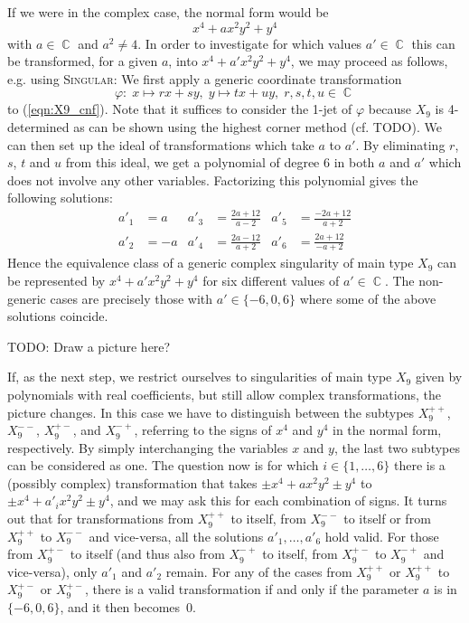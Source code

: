 \documentclass{amsproc}
\newcommand{\Singular}{\textsc{Singular}}
\DeclareMathOperator{\C}{\mathbb{C}}
\begin{document}
If we were in the complex case, the normal form would be
\begin{equation}\label{eqn:X9_cnf}
x^4 +ax^2y^2 +y^4
\end{equation}
with $a \in \C$ and $a^2 \neq 4$. In order to investigate for which values
$a' \in \C$ this can be transformed, for a given $a$, into
$x^4 +a'x^2y^2 +y^4$, we may proceed as follows, e.g. using \Singular:
We first apply a generic coordinate transformation
\[
\varphi: \; x \mapsto rx+sy, \; y \mapsto tx+uy, \; r,s,t,u \in \C
\]
to (\ref{eqn:X9_cnf}). Note that it suffices to consider the 1-jet of $\varphi$
because $X_9$ is 4-determined as can be shown using the highest corner method
(cf. TODO). We can then set up the ideal of transformations which take $a$ to
$a'$. By eliminating $r$, $s$, $t$ and $u$ from this ideal, we get a polynomial
of degree 6 in both $a$ and $a'$ which does not involve any other variables.
Factorizing this polynomial gives the following solutions:
\begin{align*}
a'_1 &= a  & a'_3 &= \frac{2a+12}{a-2} & a'_5 &= \frac{-2a+12}{a+2} \\
a'_2 &= -a & a'_4 &= \frac{2a-12}{a+2} & a'_6 &= \frac{2a+12}{-a+2}
\end{align*}
Hence the equivalence class of a generic complex singularity of main type $X_9$
can be represented by $x^4 +a'x^2y^2 +y^4$ for six different values of
$a' \in \C$. The non-generic cases are precisely those with
$a' \in \{-6, 0, 6\}$ where some of the above solutions coincide.

TODO: Draw a picture here?

If, as the next step, we restrict ourselves to singularities of main type $X_9$
given by polynomials with real coefficients, but still allow complex
transformations, the picture changes. In this case we have to distinguish
between the subtypes $X_9^{++}$, $X_9^{--}$, $X_9^{+-}$, and $X_9^{-+}$,
referring to the signs of $x^4$ and $y^4$ in the normal form, respectively. By
simply interchanging the variables $x$ and $y$, the last two subtypes can be
considered as one.
The question now is for which $i \in \{1, \ldots, 6\}$ there is a (possibly
complex) transformation that takes
$\pm x^4 +ax^2y^2 \pm y^4$ to $\pm x^4 +a'_i x^2y^2 \pm y^4$, and we may
ask this for each combination of signs.
It turns out that for transformations from $X_9^{++}$ to itself, from
$X_9^{--}$ to itself or from $X_9^{++}$ to $X_9^{--}$ and vice-versa, all the
solutions $a'_1, \ldots, a'_6$ hold valid. For those from $X_9^{+-}$ to
itself (and thus also from $X_9^{-+}$ to itself, from $X_9^{+-}$ to
$X_9^{-+}$
and vice-versa), only $a'_1$ and $a'_2$ remain. For any of the cases from
$X_9^{++}$ or $X_9^{++}$ to $X_9^{+-}$ or $X_9^{+-}$, there is a valid
transformation if and only if the parameter $a$ is in $\{-6, 0, 6\}$, and it
then becomes~$0$.
\end{document}
